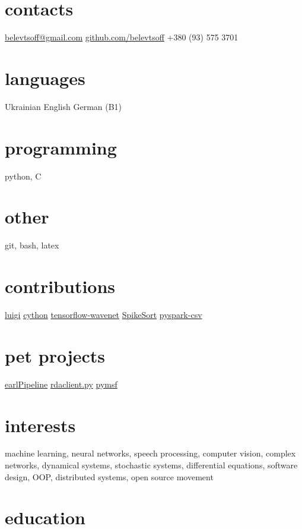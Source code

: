 \documentclass[]{cv}
\begin{document}
       {}


\begin{aside}
  \section{contacts}
    \href{mailto:belevtsoff@gmail.com}{belevtsoff@gmail.com}
    \href{https://github.com/belevtsoff}{github.com/belevtsoff}
    +380 (93) 575 3701
  \section{languages}
    Ukrainian
    English
    German (B1)
  \section{programming}
    python, C
  \section{other}
    git, bash, latex
  \section{contributions}
    \href{https://github.com/spotify/luigi}{luigi}
    \href{https://github.com/cython/cython}{cython}
    \href{https://github.com/ibab/tensorflow-wavenet}{tensorflow-wavenet}
    \href{https://github.com/btel/SpikeSort}{SpikeSort}
    \href{https://github.com/seahboonsiew/pyspark-csv}{pyspark-csv}
  \section{pet projects}
    \href{https://github.com/belevtsoff/earlPipeline}{earlPipeline}
    \href{https://github.com/belevtsoff/rdaclient.py}{rdaclient.py}
    \href{https://github.com/belevtsoff/pymsf}{pymsf}
\end{aside}

\section{interests}

machine learning, neural networks, speech processing, computer vision, complex networks, dynamical systems, stochastic systems, differential equations, software design, OOP, distributed systems, open source movement

\section{education}
\end{document}
